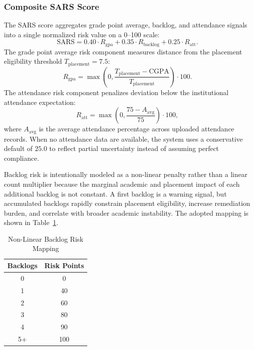 \documentclass{article}
\begin{document}
\subsubsection{Composite SARS Score}
The SARS score aggregates grade point average, backlog, and attendance signals into a single normalized risk value on a 0--100 scale:
\begin{equation}
\mathrm{SARS} = 0.40 \cdot R_{\mathrm{gpa}} + 0.35 \cdot R_{\mathrm{backlog}} + 0.25 \cdot R_{\mathrm{att}}.
\label{eq:sars}
\end{equation}
The grade point average risk component measures distance from the placement eligibility threshold $T_{\mathrm{placement}} = 7.5$:
\begin{equation}
R_{\mathrm{gpa}} = \max\left(0, \frac{T_{\mathrm{placement}} - \mathrm{CGPA}}{T_{\mathrm{placement}}}\right) \cdot 100.
\label{eq:gpa-risk}
\end{equation}
The attendance risk component penalizes deviation below the institutional attendance expectation:
\begin{equation}
R_{\mathrm{att}} = \max\left(0, \frac{75 - A_{\mathrm{avg}}}{75}\right) \cdot 100,
\label{eq:attendance-risk}
\end{equation}
where $A_{\mathrm{avg}}$ is the average attendance percentage across uploaded attendance records. When no attendance data are available, the system uses a conservative default of $25.0$ to reflect partial uncertainty instead of assuming perfect compliance.

Backlog risk is intentionally modeled as a non-linear penalty rather than a linear count multiplier because the marginal academic and placement impact of each additional backlog is not constant. A first backlog is a warning signal, but accumulated backlogs rapidly constrain placement eligibility, increase remediation burden, and correlate with broader academic instability. The adopted mapping is shown in Table~\ref{tab:backlog-risk}.

\begin{table}[t]
\caption{Non-Linear Backlog Risk Mapping}
\label{tab:backlog-risk}
\centering
\begin{tabular}{cc}
\toprule
Backlogs & Risk Points \\
\midrule
0 & 0 \\
1 & 40 \\
2 & 60 \\
3 & 80 \\
4 & 90 \\
5+ & 100 \\
\bottomrule
\end{tabular}
\end{table}
\end{document}
